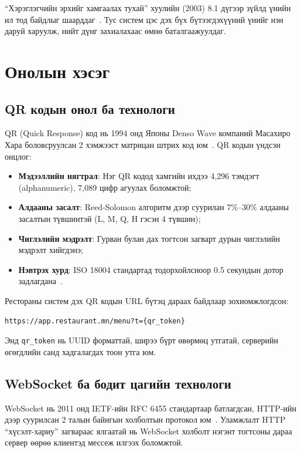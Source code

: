 ``Хэрэглэгчийн эрхийг хамгаалах тухай'' хуулийн (2003) 8.1 дүгээр зүйлд үнийн
ил тод байдлыг шаарддаг~\cite{cpal2003}. Тус систем цэс дэх бүх бүтээгдэхүүний
үнийг нэн даруй харуулж, нийт дүнг захиалахаас өмнө баталгаажуулдаг.

\section{Онолын хэсэг}

\subsection{QR кодын онол ба технологи}

QR (Quick Response) код нь 1994 онд Японы Denso Wave компаний Масахиро Хара боловсруулсан
2 хэмжээст матрицан штрих код юм~\cite{iso18004}. QR кодын үндсэн онцлог:

\begin{itemize}
  \item \textbf{Мэдээллийн нягтрал}: Нэг QR кодод хамгийн ихдээ 4,296 тэмдэгт
    (alphanumeric), 7,089 цифр агуулах боломжтой;
  \item \textbf{Алдааны засалт}: Reed-Solomon алгоритм дээр суурилан 7\%--30\% алдааны
    засалтын түвшинтэй (L, M, Q, H гэсэн 4 түвшин);
  \item \textbf{Чиглэлийн мэдрэлт}: Гурван булан дах тогтсон загварт дурын чиглэлийн
    мэдрэлт хийгдэнэ;
  \item \textbf{Нэвтрэх хурд}: ISO 18004 стандартад тодорхойлсноор 0.5 секундын дотор
    задлагдана~\cite{iso18004}.
\end{itemize}

Рестораны систем дэх QR кодын URL бүтэц дараах байдлаар зохиомжлогдсон:

\begin{center}
\texttt{https://app.restaurant.mn/menu?t=\{qr\_token\}}
\end{center}

Энд \texttt{qr\_token} нь UUID форматтай, ширээ бүрт өвөрмөц утгатай, серверийн
өгөгдлийн санд хадгалагдах тоон утга юм.

\subsection{WebSocket ба бодит цагийн технологи}

WebSocket нь 2011 онд IETF-ийн RFC 6455 стандартаар батлагдсан, HTTP-ийн дээр
суурилсан 2 талын байнгын холболтын протокол юм~\cite{rfc6455}. Уламжлалт HTTP
``хүсэлт-хариу'' загвараас ялгаатай нь WebSocket холболт нэгэнт тогтсоны дараа
сервер өөрөө клиентэд мессеж илгээх боломжтой.

